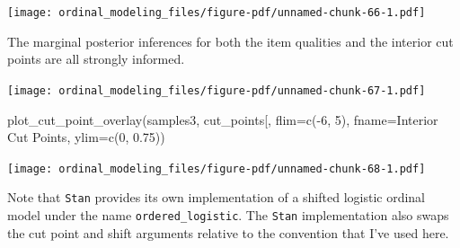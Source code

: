 \documentclass[
  letterpaper,
  DIV=11,
  numbers=noendperiod]{scrartcl}
\newenvironment{Shaded}{\begin{snugshade}}{\end{snugshade}}
\newcommand{\AttributeTok}[1]{\textcolor[rgb]{0.40,0.45,0.13}{#1}}
\newcommand{\ControlFlowTok}[1]{\textcolor[rgb]{0.00,0.23,0.31}{#1}}
\newcommand{\DecValTok}[1]{\textcolor[rgb]{0.68,0.00,0.00}{#1}}
\newcommand{\FloatTok}[1]{\textcolor[rgb]{0.68,0.00,0.00}{#1}}
\newcommand{\FunctionTok}[1]{\textcolor[rgb]{0.28,0.35,0.67}{#1}}
\newcommand{\NormalTok}[1]{\textcolor[rgb]{0.00,0.23,0.31}{#1}}
\newcommand{\OtherTok}[1]{\textcolor[rgb]{0.00,0.23,0.31}{#1}}
\newcommand{\SpecialCharTok}[1]{\textcolor[rgb]{0.37,0.37,0.37}{#1}}
\newcommand{\StringTok}[1]{\textcolor[rgb]{0.13,0.47,0.30}{#1}}
\begin{document}
\texttt{[image: ordinal\_modeling\_files/figure-pdf/unnamed-chunk-66-1.pdf]}

The marginal posterior inferences for both the item qualities and the
interior cut points are all strongly informed.

\begin{Shaded}
\end{Shaded}

\texttt{[image: ordinal\_modeling\_files/figure-pdf/unnamed-chunk-67-1.pdf]}

\begin{Shaded}
\begin{Highlighting}[]
\FunctionTok{plot\_cut\_point\_overlay}\NormalTok{(samples3, }\StringTok{\textquotesingle{}cut\_points[\textquotesingle{}}\NormalTok{,}
                       \AttributeTok{flim=}\FunctionTok{c}\NormalTok{(}\SpecialCharTok{{-}}\DecValTok{6}\NormalTok{, }\DecValTok{5}\NormalTok{), }\AttributeTok{fname=}\StringTok{\textquotesingle{}Interior Cut Points\textquotesingle{}}\NormalTok{,}
                       \AttributeTok{ylim=}\FunctionTok{c}\NormalTok{(}\DecValTok{0}\NormalTok{, }\FloatTok{0.75}\NormalTok{))}
\end{Highlighting}
\end{Shaded}

\texttt{[image: ordinal\_modeling\_files/figure-pdf/unnamed-chunk-68-1.pdf]}

Note that \texttt{Stan} provides its own implementation of a shifted
logistic ordinal model under the name \texttt{ordered\_logistic}. The
\texttt{Stan} implementation also swaps the cut point and shift
arguments relative to the convention that I've used here.
\end{document}

